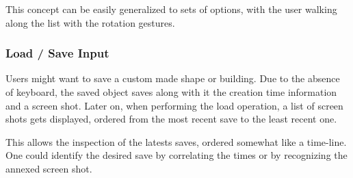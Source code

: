 This concept can be easily generalized to sets of options, with the user walking along the list with the rotation gestures.


\subsubsection{Load / Save Input}


Users might want to save a custom made shape or building. Due to the absence of keyboard, the saved object
saves along with it the creation time information and a screen shot.
Later on, when performing the load operation, a list of screen shots gets displayed, ordered from the most
recent save to the least recent one.

This allows the inspection of the latests saves, ordered somewhat like a time-line. One could identify the
desired save by correlating the times or by recognizing the annexed screen shot.

